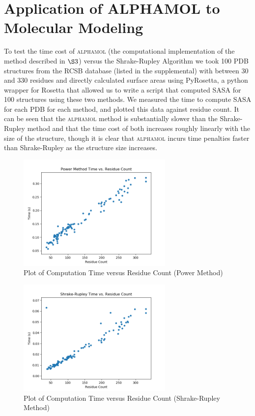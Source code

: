 \documentclass{article}
\begin{document}
\section{Application of ALPHAMOL to Molecular Modeling}
To test the time cost of \textsc{alphamol} (the computational implementation of the method described in $\S3$) versus the Shrake-Rupley Algorithm we took 100 PDB structures from the RCSB\cite{PDB} database (listed in the supplemental) with between 30 and 330 residues and directly calculated surface areas using PyRosetta\cite{Chaudhury}, a python wrapper for Rosetta that allowed us to write a script that computed SASA for 100 structures using these two methods. We measured the time to compute SASA for each PDB for each method, and plotted this data against residue count. It can be seen that the \textsc{alphamol} method is substantially slower than the Shrake-Rupley method and that the time cost of both increases roughly linearly with the size of the structure, though it is clear that \textsc{alphamol} incurs time penalties faster than Shrake-Rupley as the structure size increases.


\begin{figure}
\centerline{\includegraphics[width=3in]{daltimes}}
\caption{Plot of Computation Time versus Residue Count (Power Method)}
\end{figure}
\begin{figure}
\centerline{\includegraphics[width=3in]{voxtimes}}
\caption{Plot of Computation Time versus Residue Count (Shrake-Rupley Method)}
\end{figure}
\end{document}
